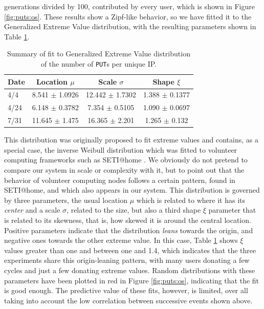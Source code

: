 \documentclass[letterpaper]{article}
\begin{document}
generations divided by 100, contributed by every user, which is shown
in Figure \ref{fig:puts:os}. These results show a Zipf-like behavior,
so we have fitted it to the Generalized Extreme Value distribution,
with the resulting parameters shown in Table \ref{tab:puts:os}.
%
\begin{table}
\caption{Summary of fit to Generalized Extreme Value distribution of
  the number of {\tt PUT}s per unique IP. \label{tab:puts:os}}
\begin{center}
\begin{tabular}{l|ccc}
\hline
Date  & Location $\mu$ & Scale $\sigma$ & Shape $\xi$ \\
\hline
4/4 &  8.541 $\pm$ 1.0926  &    12.442 $\pm$ 1.7302 &  1.388 $\pm$
0.1377 \\
4/24 & 6.148 $\pm$ 0.3782 & 7.354 $\pm$ 0.5105 & 1.090 $\pm$  0.0697  \\
7/31 & 11.645 $\pm$ 1.475 & 16.365 $\pm$ 2.201 &  1.265 $\pm$ 0.132   \\
\hline
\end{tabular}
\end{center}
\end{table}
%
This distribution was originally proposed to fit extreme values
\citep{resnick2013extreme} and contains, as a special case, the inverse
Weibull distribution which was fitted to volunteer computing
frameworks such as SETI@home \citep{javadi2009mining}. We obviously do
not pretend to compare our system in scale or complexity with it, but
to point out that the behavior of volunteer computing nodes follows a
certain pattern, found in SETI@home, and which also appears in our system. This
distribution is governed by three parameters, the usual location $\mu$
which is related to where it has its {\em center} and a scale $\sigma$,
related to the size, but also a third shape $\xi$ parameter that is
related to its skewness, that is, how skewed it is around the central
location. Positive parameters indicate that the distribution {\em
  leans} towards the origin, and negative ones towards the other extreme
value. In this case, Table \ref{tab:puts:os} shows $\xi$ values
greater than one and between one and 1.4, which indicates that the
three experiments share this origin-leaning pattern, with many users
donating a few cycles and just a few donating extreme values. Random
distributions with these parameters have been plotted in red in
Figure \ref{fig:puts:os}, indicating that the fit is good enough. The
predictive value of these fits, however, is limited, over all taking
into account the low correlation between successive events shown
above.
\end{document}
